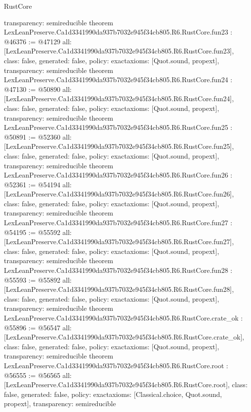 \begin{lexlean}{RustCore}
\begin{coremodule}
{  transparency: semireducible
}
theorem LexLeanPreserve.Ca1d3341990da937b7032e945f34cb805.R6.RustCore.fun23 : @46376 := @47129 {
  all: [LexLeanPreserve.Ca1d3341990da937b7032e945f34cb805.R6.RustCore.fun23],
  class: false,
  generated: false,
  policy: exact{axioms: [Quot.sound, propext]},
  transparency: semireducible
}
theorem LexLeanPreserve.Ca1d3341990da937b7032e945f34cb805.R6.RustCore.fun24 : @47130 := @50890 {
  all: [LexLeanPreserve.Ca1d3341990da937b7032e945f34cb805.R6.RustCore.fun24],
  class: false,
  generated: false,
  policy: exact{axioms: [Quot.sound, propext]},
  transparency: semireducible
}
theorem LexLeanPreserve.Ca1d3341990da937b7032e945f34cb805.R6.RustCore.fun25 : @50891 := @52360 {
  all: [LexLeanPreserve.Ca1d3341990da937b7032e945f34cb805.R6.RustCore.fun25],
  class: false,
  generated: false,
  policy: exact{axioms: [Quot.sound, propext]},
  transparency: semireducible
}
theorem LexLeanPreserve.Ca1d3341990da937b7032e945f34cb805.R6.RustCore.fun26 : @52361 := @54194 {
  all: [LexLeanPreserve.Ca1d3341990da937b7032e945f34cb805.R6.RustCore.fun26],
  class: false,
  generated: false,
  policy: exact{axioms: [Quot.sound, propext]},
  transparency: semireducible
}
theorem LexLeanPreserve.Ca1d3341990da937b7032e945f34cb805.R6.RustCore.fun27 : @54195 := @55592 {
  all: [LexLeanPreserve.Ca1d3341990da937b7032e945f34cb805.R6.RustCore.fun27],
  class: false,
  generated: false,
  policy: exact{axioms: [Quot.sound, propext]},
  transparency: semireducible
}
theorem LexLeanPreserve.Ca1d3341990da937b7032e945f34cb805.R6.RustCore.fun28 : @55593 := @55892 {
  all: [LexLeanPreserve.Ca1d3341990da937b7032e945f34cb805.R6.RustCore.fun28],
  class: false,
  generated: false,
  policy: exact{axioms: [Quot.sound, propext]},
  transparency: semireducible
}
theorem LexLeanPreserve.Ca1d3341990da937b7032e945f34cb805.R6.RustCore.crate_ok : @55896 := @56547 {
  all: [LexLeanPreserve.Ca1d3341990da937b7032e945f34cb805.R6.RustCore.crate_ok],
  class: false,
  generated: false,
  policy: exact{axioms: [Quot.sound, propext]},
  transparency: semireducible
}
theorem LexLeanPreserve.Ca1d3341990da937b7032e945f34cb805.R6.RustCore.root : @56555 := @56565 {
  all: [LexLeanPreserve.Ca1d3341990da937b7032e945f34cb805.R6.RustCore.root],
  class: false,
  generated: false,
  policy: exact{axioms: [Classical.choice, Quot.sound, propext]},
  transparency: semireducible
}


\end{coremodule}
\end{lexlean}
